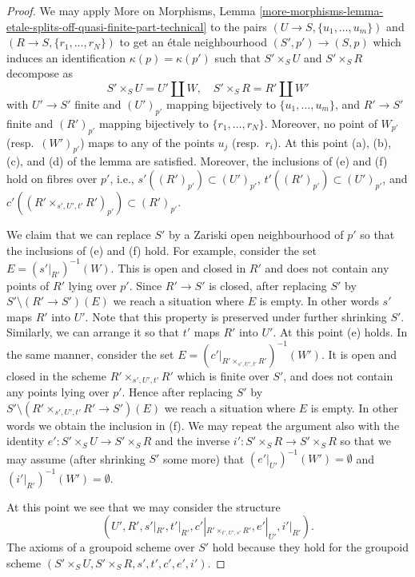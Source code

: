 \begin{proof}
\medskip\noindent
We may apply
More on Morphisms,
Lemma \ref{more-morphisms-lemma-etale-splits-off-quasi-finite-part-technical}
to the pairs
$(U \to S, \{u_1, \ldots, u_m\})$ and
$(R \to S, \{r_1, \ldots, r_N\})$
to get an \'etale neighbourhood $(S', p') \to (S, p)$
which induces an identification $\kappa(p) = \kappa(p')$
such that $S' \times_S U$ and $S' \times_S R$ decompose as
$$
S' \times_S U = U' \amalg W, \quad
S' \times_S R = R' \amalg W'
$$
with $U' \to S'$ finite and $(U')_{p'}$ mapping bijectively to
$\{u_1, \ldots, u_m\}$, and $R' \to S'$ finite and
$(R')_{p'}$ mapping bijectively to $\{r_1, \ldots, r_N\}$.
Moreover, no point of $W_{p'}$ (resp.\ $(W')_{p'}$) maps to
any of the points $u_j$ (resp.\ $r_i$). At this point (a), (b), (c), and (d)
of the lemma are satisfied. Moreover, the inclusions of (e) and (f) hold
on fibres over $p'$, i.e., $s'((R')_{p'}) \subset (U')_{p'}$,
$t'((R')_{p'}) \subset (U')_{p'}$, and
$c'((R' \times_{s', U', t'} R')_{p'}) \subset (R')_{p'}$.

\medskip\noindent
We claim that we can replace $S'$ by a Zariski open neighbourhood
of $p'$ so that the inclusions of (e) and (f) hold.
For example, consider the set $E = (s'|_{R'})^{-1}(W)$.
This is open and closed in $R'$ and does not contain any points
of $R'$ lying over $p'$. Since $R' \to S'$ is closed,
after replacing $S'$ by $S' \setminus (R' \to S')(E)$ we reach a
situation where $E$ is empty. In other words $s'$ maps $R'$ into $U'$.
Note that this property is preserved under further shrinking $S'$.
Similarly, we can arrange it so that $t'$ maps $R'$ into $U'$.
At this point (e) holds. In the same manner, consider the set
$E = (c'|_{R' \times_{s', U', t'} R'})^{-1}(W')$.
It is open and closed in the scheme $R' \times_{s', U', t'} R'$
which is finite over $S'$, and does not contain any points lying
over $p'$. Hence after replacing $S'$ by
$S' \setminus (R' \times_{s', U', t'} R' \to S')(E)$
we reach a situation where $E$ is empty. In other words we obtain
the inclusion in (f). We may repeat the argument also with the identity
$e' : S' \times_S U \to S' \times_S R$ and the inverse
$i' : S' \times_S R \to S' \times_S R$ so that we may assume
(after shrinking $S'$ some more) that $(e'|_{U'})^{-1}(W') = \emptyset$
and $(i'|_{R'})^{-1}(W') = \emptyset$.

\medskip\noindent
At this point we see that we may consider the structure
$$
(U', R', s'|_{R'}, t'|_{R'}, c'|_{R' \times_{t', U', s'} R'},
e'|_{U'}, i'|_{R'}).
$$
The axioms of a groupoid scheme over $S'$ hold
because they hold for the groupoid scheme
$(S' \times_S U, S' \times_S R, s', t', c', e', i')$.
\end{proof}
